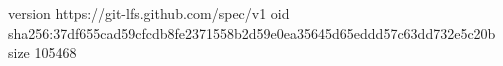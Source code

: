 version https://git-lfs.github.com/spec/v1
oid sha256:37df655cad59cfcdb8fe2371558b2d59e0ea35645d65eddd57c63dd732e5c20b
size 105468
